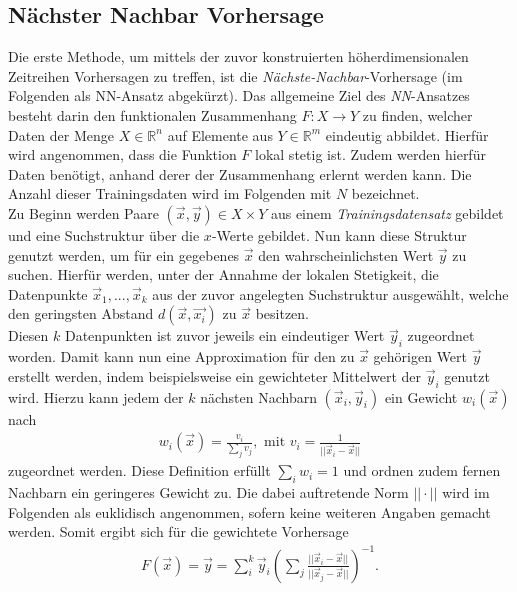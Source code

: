 \subsection{Nächster Nachbar Vorhersage}
\label{sc:theory_nn}
Die erste Methode, um mittels der zuvor konstruierten höherdimensionalen Zeitreihen Vorhersagen zu treffen, ist die \textit{Nächste-Nachbar}-Vorhersage (im Folgenden als \textsc{NN}-Ansatz abgekürzt). Das allgemeine Ziel des \textit{NN}-Ansatzes besteht darin den funktionalen Zusammenhang $F : X \rightarrow Y$ zu finden, welcher Daten der Menge $X \in \mathbb{R}^n$ auf Elemente aus $Y \in \mathbb{R}^m$ eindeutig abbildet. Hierfür wird angenommen, dass die Funktion $F$ lokal stetig ist. Zudem werden hierfür Daten benötigt, anhand derer der Zusammenhang erlernt werden kann. Die Anzahl dieser Trainingsdaten wird im Folgenden mit $N$ bezeichnet.\\
Zu Beginn werden Paare $(\vec{x},\vec{y}) \in X \times Y$ aus einem \textit{Trainingsdatensatz} gebildet und eine Suchstruktur über die $x$-Werte gebildet. Nun kann diese Struktur genutzt werden, um für ein gegebenes $\vec{x}$ den wahrscheinlichsten Wert $\vec{y}$ zu suchen. Hierfür werden, unter der Annahme der lokalen Stetigkeit, die Datenpunkte $\vec{x}_1, ..., \vec{x}_k$ aus der zuvor angelegten Suchstruktur ausgewählt, welche den geringsten Abstand $d(\vec{x}, \vec{x_i})$ zu $\vec{x}$ besitzen.\\
Diesen $k$ Datenpunkten ist zuvor jeweils ein eindeutiger Wert $\vec{y}_i$ zugeordnet worden. Damit kann nun eine Approximation für den zu $\vec{x}$ gehörigen Wert $\vec{y}$ erstellt werden, indem beispielsweise ein gewichteter Mittelwert der $\vec{y}_i$ genutzt wird. Hierzu kann jedem der $k$ nächsten Nachbarn $(\vec{x}_i, \vec{y}_i)$ ein Gewicht $w_i(\vec{x})$ nach
\begin{align*}
w_i(\vec{x}) = \frac{v_i}{\sum_j v_j}, \text{ mit } v_i = \frac{1}{||\vec{x}_i-\vec{x}||} 
\end{align*}
zugeordnet werden. Diese Definition erfüllt $\sum_i w_i = 1$ und ordnen zudem fernen Nachbarn ein geringeres Gewicht zu. Die dabei auftretende Norm $||\cdot ||$ wird im Folgenden als euklidisch angenommen, sofern keine weiteren Angaben gemacht werden. Somit ergibt sich für die gewichtete Vorhersage
\begin{align}
F(\vec{x}) = \vec{y} = \sum^k_i \vec{y}_i \left( \sum_j \frac{||\vec{x}_i-\vec{x}||}{||\vec{x}_j-\vec{x}||} \right) ^{-1}.
\end{align}

